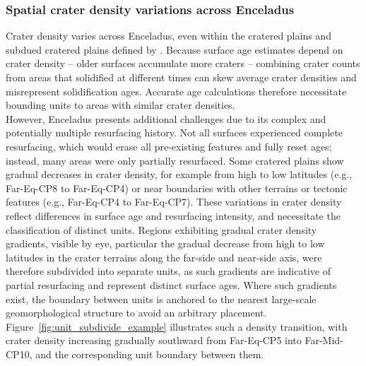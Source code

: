 \documentclass[preprint,11pt,3p,times,authoryear]{elsarticle}
\begin{document}
\subsubsection{Spatial crater density variations across Enceladus}
\label{subsec:crater_distribution}
Crater density varies across Enceladus, even within the cratered plains and subdued cratered plains defined by \citet{CrowWillard2015}. Because surface age estimates depend on crater density -- older surfaces accumulate more craters -- combining crater counts from areas that solidified at different times can skew average crater densities and misrepresent solidification ages. Accurate age calculations therefore necessitate bounding units to areas with similar crater densities.\\

However, Enceladus presents additional challenges due to its complex and potentially multiple resurfacing history. Not all surfaces experienced complete resurfacing, which would erase all pre-existing features and fully reset ages; instead, many areas were only partially resurfaced. Some cratered plains show gradual decreases in crater density, for example from high to low latitudes (e.g., Far-Eq-CP8 to Far-Eq-CP4) or near boundaries with other terrains or tectonic features (e.g., Far-Eq-CP4 to Far-Eq-CP7). These variations in crater density reflect differences in surface age and resurfacing intensity, and necessitate the classification of distinct units. 
Regions exhibiting gradual crater density gradients, visible by eye, particular the gradual decrease from high to low latitudes in the crater terrains along the far-side and near-side axis, were therefore subdivided into separate units, as such gradients are indicative of partial resurfacing and represent distinct surface ages. Where such gradients exist, the boundary between units is anchored to the nearest large-scale geomorphological structure to avoid an arbitrary placement. 
Figure~\ref{fig:unit_subdivide_example} illustrates such a density transition, with crater density increasing gradually southward from Far-Eq-CP5 into Far-Mid-CP10, and the corresponding unit boundary between them.\\
\end{document}
